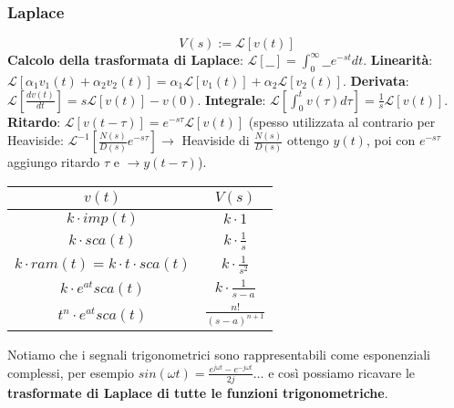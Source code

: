 \begin{landscape}
\begin{multicols*}{3}
    \subsubsection*{Laplace}
    \[
        V(s) := \mathcal{L}[v(t)]
    \]
    \textbf{Calcolo della trasformata di Laplace}: $\mathcal{L}[\_\_] =  \int_{0}^{\infty}\_\_ e^{-st} dt$.\newline
    \textbf{Linearità}: $\mathcal{L}[\alpha_1 v_1(t) + \alpha_2 v_2(t)] = \alpha_1 \mathcal{L}[v_1(t)] + \alpha_2 \mathcal{L}[v_2(t)]$.\newline
    \textbf{Derivata}: $\mathcal{L}\left[ \frac{d v(t)}{dt} \right] = s \mathcal{L}[v(t)] - v(0)$.\newline
    \textbf{Integrale}: $\mathcal{L}\left[ \int_{0}^{t} v(\tau) d \tau \right] = \frac{1}{s} \mathcal{L}[v(t)]$.\newline
    \textbf{Ritardo}: $ \mathcal{L}[ v(t - \tau)] = e^{-s \tau} \mathcal{L}[v(t)]$ (spesso utilizzata al contrario per Heaviside: $\mathcal{L}^{-1}\left[\frac{N(s)}{D(s)}e^{-s \tau}\right] \rightarrow $ Heaviside di $\frac{N(s)}{D(s)}$ ottengo $y(t)$, poi con $e^{-s \tau}$ aggiungo ritardo $\tau$ e $\rightarrow  y(t- \tau)$).\newline
    \renewcommand{\arraystretch}{2}
    \begin{center}
        \begin{tabular}{ |c|c| } 
        \hline
        \;\;\;\;\;\;\;\;\;\;\;\;\;\;\;$v(t)$ \;\;\;\;\;\;\;\;\;\;\;\;\;\;\;& \;\;\;\;\;\;\;\;\;\;\;\;\;\;\;$V(s)$ \;\;\;\;\;\;\;\;\;\;\;\;\;\;\;\\ 
        \hline
        $k \cdot imp(t)$ & $k \cdot 1$ \\ 
        $k \cdot sca(t)$ & $k \cdot \frac{1}{s}$  \\ 
        $k \cdot ram(t) =k \cdot t \cdot  sca(t)$ & $k \cdot \frac{1}{s^2}$ \\
        $k \cdot e^{at}sca(t)$ & $k \cdot \frac{1}{s-a}$ \\ 
        $t^{n}\cdot e^{at}sca(t)$ & $\frac{n!}{(s-a)^{n+1}}$\\ 
        \hline
        \end{tabular}
    \end{center}
    \renewcommand{\arraystretch}{1}
    Notiamo che i segnali trigonometrici sono rappresentabili come esponenziali complessi, per esempio $sin(\omega t) = \frac{e^{j \omega t}- e^{-j \omega t}}{2j} \dots$ e così possiamo ricavare le \textbf{trasformate di Laplace di tutte le funzioni trigonometriche}.

\end{multicols*}
\end{landscape}

